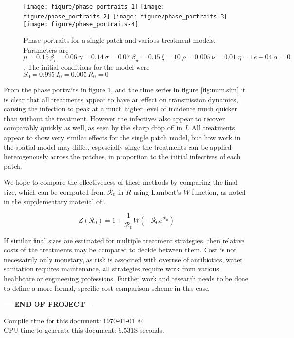 \documentclass[12pt]{article}\usepackage[]{graphicx}\usepackage[]{color}
\newenvironment{knitrout}{}{} %
\begin{document}
\begin{knitrout}
\color{fgcolor}\begin{figure}

{\centering \texttt{[image: figure/phase\_portraits-1]} 
\texttt{[image: figure/phase\_portraits-2]} 
\texttt{[image: figure/phase\_portraits-3]} 
\texttt{[image: figure/phase\_portraits-4]} 

}

\caption{\label{fig:phase.portraits} Phase portraits for a single patch and various treatment models. Parameters are $\mu=0.15\ \beta_i=0.06\ \gamma=0.14\ \sigma=0.07\ \beta_w=0.15\ \xi=10\ \rho=0.005\ \nu=0.01\ \eta=1e-04\ \alpha=0$. The initial conditions for the model were $S_0=0.995\ I_0=0.005\ R_0=0$}\label{fig:phase.portraits}
\end{figure}


\end{knitrout}

\FloatBarrier

From the phase portraits in figure \ref{fig:phase.portraits}, and the time series in figure \ref{fig:num.sim} it is clear that all treatments appear to have an effect on transmission dynamics, causing the infection to peak at a much higher level of incidence much quicker than without the treatment.
However the infectives also appear to recover comparably quickly as well, as seen by the sharp drop off in $I$.
All treatments appear to show very similar effects for the single patch model, but how work in the spatial model may differ, espescially singe the treatments can be applied heterogenously across the patches, in proportion to the initial infectives of each patch.

We hope to compare the effectiveness of these methods by comparing the final size, which can be computed from ${\mathcal R_0}$ in $R$ using Lambert's $W$ function, as noted in the supplementary material of \cite{link20}.
\begin{linenomath}
\begin{equation}
    Z({\mathcal R_0}) = 1+\frac{1}{{\mathcal R_0}}W(-{\mathcal R_0}e^{{\mathcal R_0}})
\end{equation}
\end{linenomath}
If similar final sizes are estimated for multiple treatment strategies, then relative costs of the treatments may be compared to decide between them.
Cost is not necessairily only monetary, as risk is associted with overuse of antibiotics, water sanitation requires maintenance, all strategies require work from various healthcare or engineering professions.
Further work and research needs to be done to define a more formal, specific cost comparison scheme in this case.



\bigskip\vfill
\centerline{\bf--- END OF PROJECT---}
\bigskip
Compile time for this document:
\today\ @ \thistime\\
CPU time to generate this document: 9.531S seconds.
\printbibliography
\end{document}
